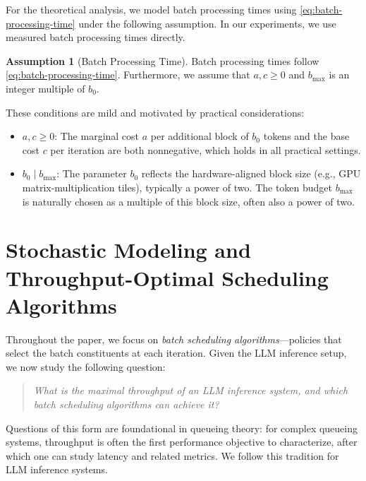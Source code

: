 \documentclass[11pt]{article}
\theoremstyle{plain}
\theoremstyle{definition}
\newtheorem{assumption}[theorem]{Assumption}
\theoremstyle{remark}
\begin{document}
For the theoretical analysis, we model batch processing times using \cref{eq:batch-processing-time} under the following assumption. In our experiments, we use measured batch processing times directly.
\begin{assumption}[Batch Processing Time]\label{asm:batch-processing-time}
    Batch processing times follow \cref{eq:batch-processing-time}. Furthermore, we assume that $a, c\geq 0$ and $b_{\max}$ is an integer multiple of $b_0$.
\end{assumption}
These conditions are mild and motivated by practical considerations:
\begin{itemize}
    \item $a, c \geq 0$: The marginal cost $a$ per additional block of $b_0$ tokens and the base cost $c$ per iteration are both nonnegative, which holds in all practical settings.
    \item $b_0 \mid b_{\max}$: The parameter $b_0$ reflects the hardware-aligned block size (e.g., GPU matrix-multiplication tiles), typically a power of two. The token budget $b_{\max}$ is naturally chosen as a multiple of this block size, often also a power of two.
\end{itemize}


\section{Stochastic Modeling and Throughput-Optimal Scheduling Algorithms}
Throughout the paper, we focus on \textit{batch scheduling algorithms}---policies that select the batch constituents at each iteration. Given the LLM inference setup, we now study the following question:
\begin{quote}
\it{What is the maximal throughput of an LLM inference system, and which batch scheduling algorithms can achieve it?}
\end{quote}
Questions of this form are foundational in queueing theory: for complex queueing systems, throughput is often the first performance objective to characterize, after which one can study latency and related metrics. We follow this tradition for LLM inference systems.
\end{document}
